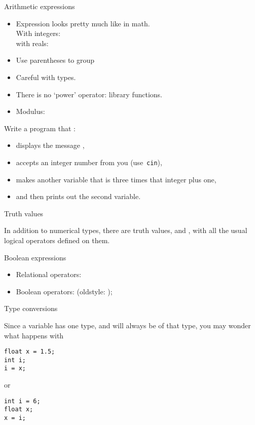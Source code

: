 \begin{slide}{Arithmetic expressions}
  \label{sl:arith-expr}
  \begin{itemize}
  \item
    Expression looks pretty much like in math.\\
    With integers: \\
    with reals: 
  \item Use parentheses to group 
  \item Careful with types.
  \item There is no `power' operator: library functions.
  \item Modulus: 
  \end{itemize}
\end{slide}

\begin{exercise}
  \label{ex:cin-cout3np1}
  Write a program that :
  \begin{itemize}
  \item displays the message ,
  \item accepts an integer number from you (use~\lstinline{cin}),
  \item makes another variable that is three times that integer plus one,
  \item and then prints out the second variable.
  \end{itemize}
\end{exercise}

 {Truth values}

In addition to numerical types, there are truth values,
 and , with all the usual logical
operators defined on them.

\begin{block}{Boolean expressions}
  \label{sl:bool-expr}
  \begin{itemize}
  \item Relational operators: \n{== != < > <= >=}
  \item Boolean operators:  (oldstyle:  \n{! && ||});
  \end{itemize}
\end{block}

 {Type conversions}

Since a variable has one type, and will always be of that type,
you may wonder what happens with
\begin{lstlisting}
float x = 1.5;
int i;
i = x;
\end{lstlisting}
or 
\begin{lstlisting}
int i = 6;
float x;
x = i;
\end{lstlisting}

